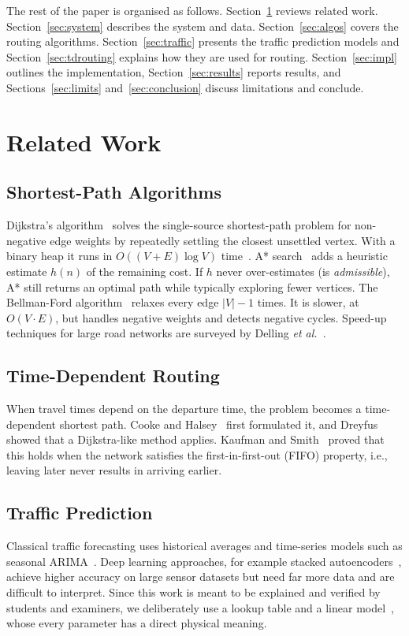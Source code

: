 \documentclass[conference]{IEEEtran}
\begin{document}
The rest of the paper is organised as follows. Section~\ref{sec:related}
reviews related work. Section~\ref{sec:system} describes the system and
data. Section~\ref{sec:algos} covers the routing algorithms.
Section~\ref{sec:traffic} presents the traffic prediction models and
Section~\ref{sec:tdrouting} explains how they are used for routing.
Section~\ref{sec:impl} outlines the implementation, Section~\ref{sec:results}
reports results, and Sections~\ref{sec:limits} and~\ref{sec:conclusion}
discuss limitations and conclude.

\section{Related Work}\label{sec:related}

\subsection{Shortest-Path Algorithms}
Dijkstra's algorithm~\cite{dijkstra1959} solves the single-source
shortest-path problem for non-negative edge weights by repeatedly
settling the closest unsettled vertex. With a binary heap it runs in
$O((V+E)\log V)$ time~\cite{clrs}. A* search~\cite{hart1968} adds a
heuristic estimate $h(n)$ of the remaining cost. If $h$ never
over-estimates (is \emph{admissible}), A* still returns an optimal path
while typically exploring fewer vertices. The Bellman-Ford
algorithm~\cite{bellman1958,ford1956} relaxes every edge $|V|-1$ times.
It is slower, at $O(V\cdot E)$, but handles negative weights and detects
negative cycles. Speed-up techniques for large road networks are
surveyed by Delling \emph{et al.}~\cite{delling2009}.

\subsection{Time-Dependent Routing}
When travel times depend on the departure time, the problem becomes a
time-dependent shortest path. Cooke and Halsey~\cite{cooke1966} first
formulated it, and Dreyfus~\cite{dreyfus1969} showed that a Dijkstra-like
method applies. Kaufman and Smith~\cite{kaufman1993} proved that this
holds when the network satisfies the first-in-first-out (FIFO) property,
i.e., leaving later never results in arriving earlier.

\subsection{Traffic Prediction}
Classical traffic forecasting uses historical averages and time-series
models such as seasonal ARIMA~\cite{williams2003}. Deep learning
approaches, for example stacked autoencoders~\cite{lv2015}, achieve
higher accuracy on large sensor datasets but need far more data and are
difficult to interpret. Since this work is meant to be explained and
verified by students and examiners, we deliberately use a lookup table
and a linear model~\cite{hastie2009}, whose every parameter has a
direct physical meaning.
\end{document}
